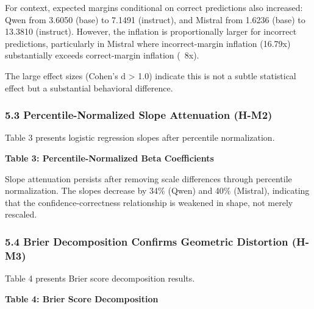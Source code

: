 For context, expected margins conditional on correct predictions also increased: Qwen from 3.6050 (base) to 7.1491 (instruct), and Mistral from 1.6236 (base) to 13.3810 (instruct). However, the inflation is proportionally larger for incorrect predictions, particularly in Mistral where incorrect-margin inflation (16.79x) substantially exceeds correct-margin inflation (~8x).

The large effect sizes (Cohen's d > 1.0) indicate this is not a subtle statistical effect but a substantial behavioral difference.

\subsubsection{5.3 Percentile-Normalized Slope Attenuation (H-M2)}

Table 3 presents logistic regression slopes after percentile normalization.

\textbf{Table 3: Percentile-Normalized Beta Coefficients}

\begin{table}[htbp]
\centering
{}
\end{table}

Slope attenuation persists after removing scale differences through percentile normalization. The slopes decrease by 34\% (Qwen) and 40\% (Mistral), indicating that the confidence-correctness relationship is weakened in shape, not merely rescaled.

\subsubsection{5.4 Brier Decomposition Confirms Geometric Distortion (H-M3)}

Table 4 presents Brier score decomposition results.

\textbf{Table 4: Brier Score Decomposition}

